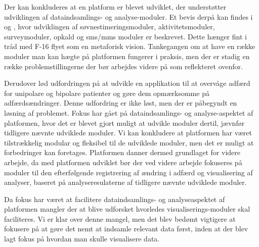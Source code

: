 Der kan konkluderes at en platform er blevet udviklet, der understøtter udviklingen af dataindsamlings- og analyse-moduler.
Et bevis derpå kan findes i \citet{misc:soevnrapp} og \citet{misc:surveyrapp}, hvor udviklingen af søvnestimeringsmoduler, aktivitetsmoduler, surveymoduler, opkald og sms/mms moduler er beskrevet.
Dette hænger fint i tråd med F-16 flyet som en metaforisk vision.
Tankegangen om at have en række moduler man kan hægte på platformen fungerer i praksis, men der er stadig en række problemstillingerne der bør arbejdes videre på som reflekteret ovenfor.

Derudover lød udfordringen på at udvikle en applikation til at overvåge adfærd for unipolare og bipolare patienter og gøre dem opmærksomme på adfærdsændringer.
Denne udfordring er ikke løst, men der er påbegyndt en løsning af problemet.
Fokus har gået på dataindsamlings- og analyse-aspektet af platformen, hvor det er blevet gjort muligt at udvikle moduler dertil, jævnfør tidligere nævnte udviklede moduler.
Vi kan konkludere at platformen har været tilstrækkelig modular og fleksibel til de udviklede moduler, men det er muligt at forbedringer kan foretages.
Platformen danner dermed grundlaget for videre arbejde, da med platformen udviklet bør der ved videre arbejde fokuseres på moduler til den efterfølgende registrering af ændring i adfærd og visualisering af analyser, baseret på analyseresulaterne af tidligere nævnte udviklede moduler.

Da fokus har været at facilitere dataindsamlings- og analyseaspektet af platformen mangler der at blive udforsket hvorledes visualiserings-moduler skal faciliteres.
Vi er klar over denne mangel, men det blev bedømt vigtigere at fokusere på at gøre det nemt at indsamle relevant data først, inden at der blev lagt fokus på hvordan man skulle visualisere data.

